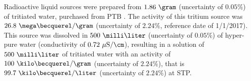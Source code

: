 Radioactive liquid sources were prepared from $1.86~\gram$ (uncertainty of $0.05\%$) of tritiated water, purchased from PTB \cite{PTB}. The activity of this tritium source was $26.8~\mega\becquerel/\gram$ (uncertainty of $2.24\%$, reference date of 1/1/2017). This source was dissolved in $500~\milli\liter$ (uncertainty of $0.05\%$) of hyper-pure water (conductivity of $0.72~\mu\text{S}/\cm$), resulting in a solution of $500~\milli\liter$ of tritiated water with an activity of $100~\kilo\becquerel/\gram$ (uncertainty of $2.24\%$), that is $99.7~\kilo\becquerel/\liter$ (uncertainty of $2.24\%$) at STP.


